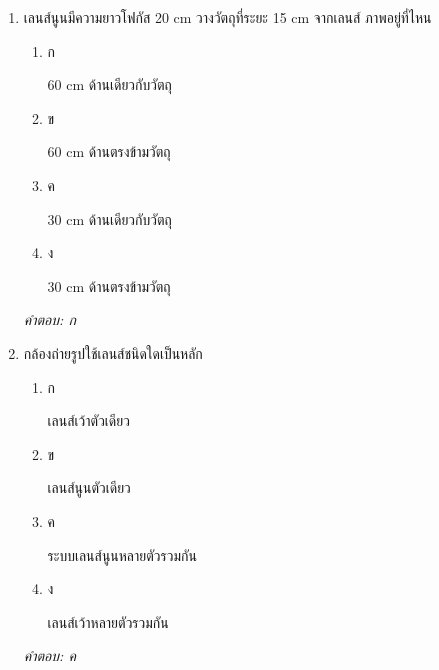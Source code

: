 \documentclass[12pt]{article}
\begin{document}
\begin{enumerate}[label=\arabic*., itemsep=0.5\baselineskip, topsep=0.5\baselineskip, leftmargin=*]
\item เลนส์นูนมีความยาวโฟกัส 20 cm วางวัตถุที่ระยะ 15 cm จากเลนส์ ภาพอยู่ที่ไหน
\begin{enumerate}[label=\alph*)., itemsep=0.3\baselineskip, topsep=0.3\baselineskip]
\item ก\ 
\begin{minipage}[t]{0.9\linewidth}
\raggedright 60 cm ด้านเดียวกับวัตถุ
\end{minipage}
\item ข\ 
\begin{minipage}[t]{0.9\linewidth}
\raggedright 60 cm ด้านตรงข้ามวัตถุ
\end{minipage}
\item ค\ 
\begin{minipage}[t]{0.9\linewidth}
\raggedright 30 cm ด้านเดียวกับวัตถุ
\end{minipage}
\item ง\ 
\begin{minipage}[t]{0.9\linewidth}
\raggedright 30 cm ด้านตรงข้ามวัตถุ
\end{minipage}
\end{enumerate}
\vspace{-0.3\baselineskip}
\begin{small}
\textit{คำตอบ: ก}
\end{small}

\item กล้องถ่ายรูปใช้เลนส์ชนิดใดเป็นหลัก
\begin{enumerate}[label=\alph*)., itemsep=0.3\baselineskip, topsep=0.3\baselineskip]
\item ก\ 
\begin{minipage}[t]{0.9\linewidth}
\raggedright เลนส์เว้าตัวเดียว
\end{minipage}
\item ข\ 
\begin{minipage}[t]{0.9\linewidth}
\raggedright เลนส์นูนตัวเดียว
\end{minipage}
\item ค\ 
\begin{minipage}[t]{0.9\linewidth}
\raggedright ระบบเลนส์นูนหลายตัวรวมกัน
\end{minipage}
\item ง\ 
\begin{minipage}[t]{0.9\linewidth}
\raggedright เลนส์เว้าหลายตัวรวมกัน
\end{minipage}
\end{enumerate}
\vspace{-0.3\baselineskip}
\begin{small}
\textit{คำตอบ: ค}
\end{small}


\end{enumerate}
\end{document}
